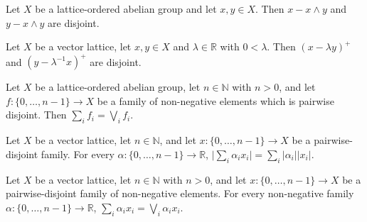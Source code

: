 \begin{lemma}
\label{lem:isVLDisjoint-sub-inf}
\leanok
{}
Let $X$ be a lattice-ordered abelian group and let $x, y \in X$. Then
$x - x \wedge y$ and $y - x \wedge y$ are disjoint.
\end{lemma}

\begin{theorem}
\label{thm:isVLDisjoint-posPart-sub-smul}
\leanok
{}
Let $X$ be a vector lattice, let $x, y \in X$ and $\lambda \in \mathbb{R}$
with $0 < \lambda$. Then $(x - \lambda y)^+$ and $(y - \lambda^{-1} x)^+$
are disjoint.
\end{theorem}

\begin{theorem}
\label{thm:sum-eq-sup-of-pairwise-isVLDisjoint-of-nonneg}
\leanok
{}
Let $X$ be a lattice-ordered abelian group, let $n \in \mathbb{N}$ with
$n > 0$, and let $f : \{0, \dots, n-1\} \to X$ be a family of
non-negative elements which is pairwise disjoint. Then
$\sum_i f_i = \bigvee_i f_i$.
\end{theorem}

\begin{theorem}
\label{thm:abs-sum-of-pairwise-isVLDisjoint}
\leanok
{}
Let $X$ be a vector lattice, let $n \in \mathbb{N}$, and let
$x : \{0, \dots, n-1\} \to X$ be a pairwise-disjoint family. For every
$\alpha : \{0, \dots, n-1\} \to \mathbb{R}$,
$\lvert \sum_i \alpha_i x_i \rvert = \sum_i \lvert \alpha_i \rvert
\lvert x_i \rvert$.
\end{theorem}

\begin{theorem}
\label{thm:sup-smul-eq-sum-of-pairwise-isVLDisjoint-of-nonneg}
\leanok
{}
Let $X$ be a vector lattice, let $n \in \mathbb{N}$ with $n > 0$, and let
$x : \{0, \dots, n-1\} \to X$ be a pairwise-disjoint family of
non-negative elements. For every non-negative family
$\alpha : \{0, \dots, n-1\} \to \mathbb{R}$,
$\sum_i \alpha_i x_i = \bigvee_i \alpha_i x_i$.
\end{theorem}

